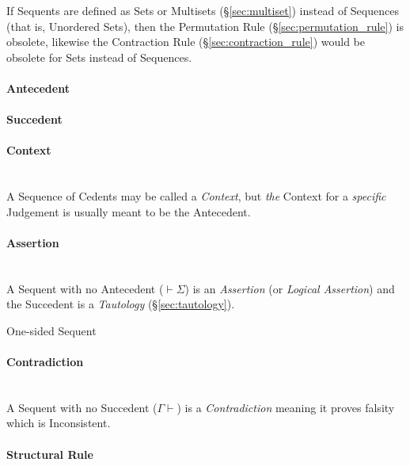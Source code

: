 If Sequents are defined as Sets or Multisets (\S\ref{sec:multiset})
instead of Sequences (that is, Unordered Sets), then the Permutation
Rule (\S\ref{sec:permutation_rule}) is obsolete, likewise the
Contraction Rule (\S\ref{sec:contraction_rule}) would be obsolete for
Sets instead of Sequences.



\paragraph{Antecedent}\label{sec:antecedent}

\paragraph{Succedent}\label{sec:succedent}

\paragraph{Context}\label{sec:sequent_context} \hfill \\

A Sequence of Cedents may be called a \emph{Context}, but \emph{the}
Context for a \emph{specific} Judgement is usually meant to be the
Antecedent.



\paragraph{Assertion}\label{sec:assertion} \hfill \\

A Sequent with no Antecedent ($\vdash \Sigma$) is an \emph{Assertion}
(or \emph{Logical Assertion}) and the Succedent is a \emph{Tautology}
(\S\ref{sec:tautology}).

One-sided Sequent



\paragraph{Contradiction}\label{sec:contradiction} \hfill \\

A Sequent with no Succedent ($\Gamma \vdash$) is a
\emph{Contradiction} meaning it proves falsity which is
Inconsistent.



\paragraph{Structural Rule}\label{sec:structural_rule} \hfill \\

